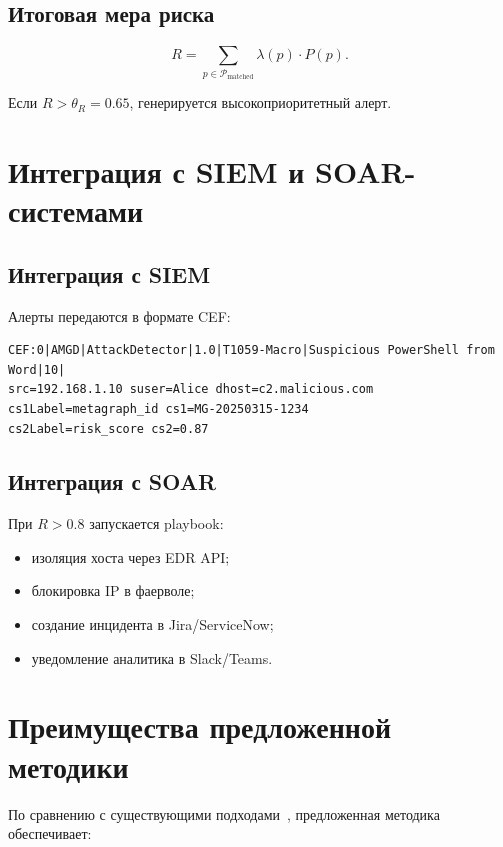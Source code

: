 \documentclass{article}
\begin{document}
\subsection{Итоговая мера риска}

\begin{equation}
    R = \sum_{p \in \mathcal{P}_{\text{matched}}} \lambda(p) \cdot P(p).
    \label{eq:risk_score}
\end{equation}

Если $R > \theta_R = 0.65$, генерируется высокоприоритетный алерт.

\section{Интеграция с SIEM и SOAR-системами}\label{sec:ch3/sect6}

\subsection{Интеграция с SIEM}

Алерты передаются в формате CEF:

\begin{verbatim}
CEF:0|AMGD|AttackDetector|1.0|T1059-Macro|Suspicious PowerShell from Word|10|
src=192.168.1.10 suser=Alice dhost=c2.malicious.com 
cs1Label=metagraph_id cs1=MG-20250315-1234 
cs2Label=risk_score cs2=0.87
\end{verbatim}

\subsection{Интеграция с SOAR}

При $R > 0.8$ запускается playbook:

\noindent
\begin{itemize} 
    \item изоляция хоста через EDR API;
    \item блокировка IP в фаерволе;
    \item создание инцидента в Jira/ServiceNow;
    \item уведомление аналитика в Slack/Teams.
\end{itemize}

\section{Преимущества предложенной методики}\label{sec:ch3/sect7}

По сравнению с существующими подходами~\cite{Gorbachev2018,Latypov2020}, предложенная методика обеспечивает:
\end{document}
